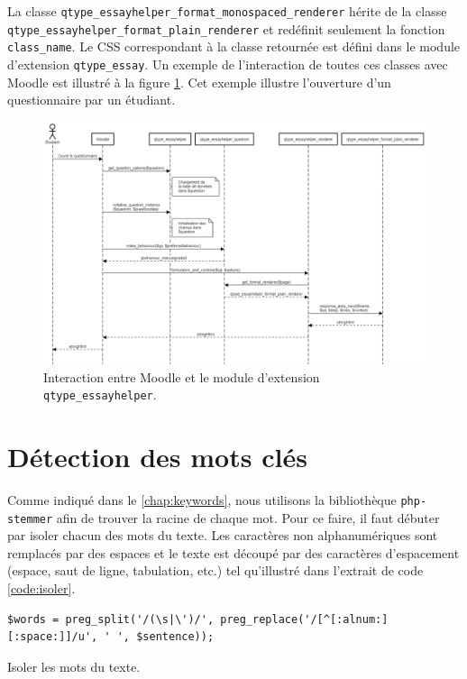 La classe \texttt{qtype\_essayhelper\_format\_monospaced\_renderer} h\'erite de la classe \texttt{qtype\_essayhelper\_format\_plain\_renderer} et red\'efinit seulement la fonction \texttt{class\_name}.
Le CSS correspondant \`a la classe retourn\'ee est d\'efini dans le module d'extension \texttt{qtype\_essay}.
Un exemple de l'interaction de toutes ces classes avec Moodle est illustr\'e \`a la figure \ref{dev-diagramme}.
Cet exemple illustre l'ouverture d'un questionnaire par un \'etudiant.
\begin{landscape}
\begin{figure}[h!]
  \includegraphics[scale=0.4]{images/diagramme-flux.png}
  \caption{Interaction entre Moodle et le module d'extension \texttt{qtype\_essayhelper}.}
  \label{dev-diagramme}
\end{figure}
\end{landscape}

\section{D\'etection des mots cl\'es}
Comme indiqu\'e dans le \autoref{chap:keywords}, nous utilisons la biblioth\`eque \texttt{php-stemmer} afin de trouver la racine de chaque mot.
Pour ce faire, il faut d\'ebuter par isoler chacun des mots du texte.
Les caract\`eres non alphanum\'eriques sont remplac\'es par des espaces et le texte est d\'ecoup\'e par des caract\`eres d'espacement (espace, saut de ligne, tabulation, etc.) tel qu'illustr\'e dans l'extrait de code \ref{code:isoler}.

\begin{lstfloat}
\begin{lstlisting}[frame=l]
$words = preg_split('/(\s|\')/', preg_replace('/[^[:alnum:][:space:]]/u', ' ', $sentence));
\end{lstlisting}
\caption{Isoler les mots du texte.}
\label{code:isoler}
\end{lstfloat}

